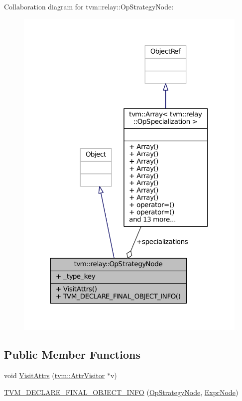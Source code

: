Collaboration diagram for tvm\+:\+:relay\+:\+:Op\+Strategy\+Node\+:
\nopagebreak
\begin{figure}[H]
\begin{center}
\leavevmode
\includegraphics[width=317pt]{classtvm_1_1relay_1_1OpStrategyNode__coll__graph}
\end{center}
\end{figure}
\subsection*{Public Member Functions}
\begin{DoxyCompactItemize}
\item 
void \hyperlink{classtvm_1_1relay_1_1OpStrategyNode_a9e3048aafa0fe847cb160fd8825f5220}{Visit\+Attrs} (\hyperlink{classtvm_1_1AttrVisitor}{tvm\+::\+Attr\+Visitor} $\ast$v)
\item 
\hyperlink{classtvm_1_1relay_1_1OpStrategyNode_a3cb5dde9cf9375f779b95d941b774f84}{T\+V\+M\+\_\+\+D\+E\+C\+L\+A\+R\+E\+\_\+\+F\+I\+N\+A\+L\+\_\+\+O\+B\+J\+E\+C\+T\+\_\+\+I\+N\+FO} (\hyperlink{classtvm_1_1relay_1_1OpStrategyNode}{Op\+Strategy\+Node}, \hyperlink{namespacetvm_1_1relay_a387f18e050d016c52ea6c4781e7cff6c}{Expr\+Node})
\end{DoxyCompactItemize}

